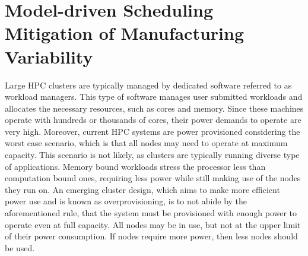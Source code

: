 \section{Model-driven Scheduling Mitigation of Manufacturing Variability}
Large HPC clusters are typically managed by dedicated software referred to as workload
managers.  This type of software manages user submitted workloads and allocates the
necessary resources, such as cores and memory.  Since these machines operate with hundreds
or thousands of cores, their power demands to operate are very high.  Moreover, current
HPC systems are power provisioned considering the worst case scenario, which is that all
nodes may need to operate at maximum capacity.  This scenario is not likely, as clusters
are typically running diverse type of applications.  Memory bound workloads stress the
processor less than computation bound ones, requiring less power while still making use of
the nodes they run on.  An emerging cluster design, which aims to make more efficient
power use and is known as overprovisioning, is to not abide by the aforementioned rule,
that the system must be provisioned with enough power to operate even at full capacity.
All nodes may be in use, but not at the upper limit of their power consumption.  If nodes
require more power, then less nodes should be used.

